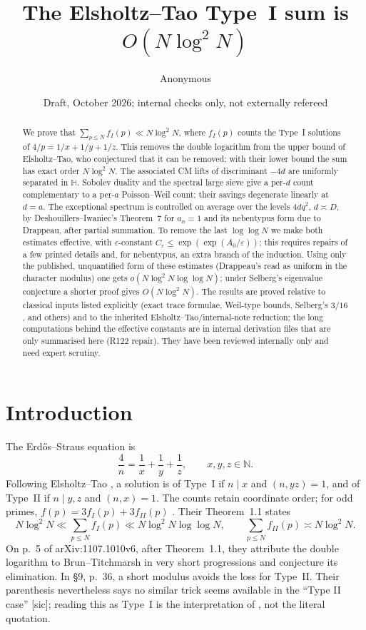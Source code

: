 \documentclass[10pt,reqno]{amsart}
\title[The Elsholtz--Tao Type I sum]{The Elsholtz--Tao Type~I sum is $O(N\log^2N)$}
\author{Anonymous}
\date{Draft, October 2026; internal checks only, not externally refereed}
\theoremstyle{definition}
\numberwithin{equation}{section}
\newcommand{\N}{\mathbb N}
\newcommand{\HH}{\mathbb H}
\begin{document}
\begin{abstract}
We prove that $\sum_{p\le N}f_I(p)\ll N\log^2N$, where $f_I(p)$ counts the
Type~I solutions of $4/p=1/x+1/y+1/z$. This removes the double logarithm
from the upper bound of Elsholtz--Tao, who conjectured that it can be
removed; with their lower bound the sum has exact order $N\log^2N$.
The associated CM lifts of discriminant $-4d$ are uniformly separated
in $\HH$. Sobolev duality and the spectral large sieve give a per-$d$
count complementary to a per-$a$ Poisson--Weil count; their savings
degenerate linearly at $d=a$. The exceptional spectrum is controlled on
average over the levels $4dq^2$, $d\asymp D$, by Deshouillers--Iwaniec's
Theorem~7 for $a_n=1$ and its nebentypus form due to Drappeau, after
partial summation. To remove the last $\log\log N$ we make both estimates
effective, with $\varepsilon$-constant $C_\varepsilon\le\exp(\exp(A_0/\varepsilon))$;
this requires repairs of a few printed details and, for nebentypus, an
extra branch of the induction. Using only the published, unquantified
form of these estimates (Drappeau's read as uniform in the character
modulus) one gets $o(N\log^2N\log\log N)$; under Selberg's
eigenvalue conjecture a shorter proof gives $O(N\log^2N)$.
The results are proved relative to classical inputs listed explicitly
(exact trace formulae, Weil-type bounds, Selberg's $3/16$, and others) and to
the inherited Elsholtz--Tao/internal-note reduction; the long computations
behind the effective constants are in internal derivation files that are
only summarised here (R122 repair). They have been
reviewed internally only and need expert scrutiny.
\end{abstract}
\maketitle
\setcounter{tocdepth}{1}
\tableofcontents

\section{Introduction}\label{sec:intro}
The Erd\H{o}s--Straus equation is
\begin{equation}\label{A:eq:es}
 \frac4n=\frac1x+\frac1y+\frac1z,\qquad x,y,z\in\N.
\end{equation}
Following Elsholtz--Tao \cite{ET}, a solution is of Type~I if $n\mid x$ and
$(n,yz)=1$, and of Type~II if $n\mid y,z$ and $(n,x)=1$.
The counts retain coordinate order; for odd primes,
$f(p)=3f_I(p)+3f_{II}(p)$ \cite[(1.4)]{ET}.
Their Theorem~1.1 states
\begin{equation}\label{A:eq:et}
 N\log^2N\ll\sum_{p\le N}f_I(p)\ll N\log^2N\log\log N,
 \qquad \sum_{p\le N}f_{II}(p)\asymp N\log^2N.
\end{equation}
On p.~5 of arXiv:1107.1010v6, after Theorem~1.1, they attribute the double
logarithm to Brun--Titchmarsh in very short progressions and conjecture its
elimination. In \S9, p.~36, a short modulus avoids the loss for Type~II.
Their parenthesis nevertheless says no similar trick seems available in the
``Type II case'' [sic]; reading this as Type~I is the interpretation of
\cite[\S1]{MN3}, not the literal quotation.
\end{document}
